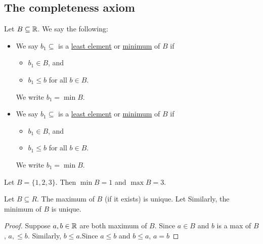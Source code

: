 \documentclass[11pt]{article}
\begin{document}
\subsection{The completeness axiom}
Let \(B \subseteq \mathbb R\). We say the following:
\begin{itemize}
	\item We say \(b_1 \subseteq\) is a \underline{least element} or \underline{minimum}
	      of \(B\) if
	      \begin{itemize}
		      \item \(b_1 \in B\), and
		      \item \(b_1 \leq b\) for all \(b \in B\).
	      \end{itemize}
	      We write \(b_1 = \min B\).

	\item We say \(b_1 \subseteq\) is a \underline{least element} or \underline{minimum}
	      of \(B\) if
	      \begin{itemize}
		      \item \(b_1 \in B\), and
		      \item \(b_1 \leq b\) for all \(b \in B\).
	      \end{itemize}
	      We write \(b_1 = \min B\).
\end{itemize}
\begin{example}
	Let \(B = \{1, 2, 3\}\). Then \(\min B = 1\) and \(\max B = 3\).
\end{example}

\begin{proposition}
	Let \(B \subseteq R\). The maximum of \(B\) (if it exists) is unique. Let Similarly, the minimum of \(B\) is unique.
\end{proposition}
\begin{proof}
	Suppose \(a, b \in \mathbb R\) are both maximum of \(B\). Since \(a \in B\) and \(b\) is a max of \(B\), \(a ,\leqslant b\). Similarly, \(b \leqslant a\).Since \(a \leqslant b\) and \(b \leqslant a\), \(a = b\)
\end{proof}
\end{document}
